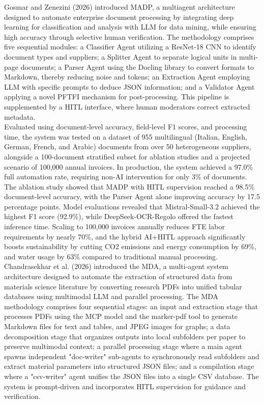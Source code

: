 \documentclass[11pt,a4paper]{report}
\begin{document}
Gosmar and Zenezini \cite{Gosmar2026MADPAM} (2026) introduced MADP, a multiagent architecture designed to automate enterprise document processing by integrating deep learning for classification and analysis with \ac{LLM} for data mining, while ensuring high accuracy through selective human verification. The methodology comprises five sequential modules: a Classifier Agent utilizing a ResNet-18 CNN to identify document types and suppliers; a Splitter Agent to separate logical units in multi-page documents; a Parser Agent using the Docling library to convert formats to Markdown, thereby reducing noise and tokens; an Extraction Agent employing \ac{LLM} with specific prompts to deduce JSON information; and a Validator Agent applying a novel \ac{PFTFI} mechanism for post-processing. This pipeline is supplemented by a \ac{HITL} interface, where human moderators correct extracted metadata.\\

Evaluated using document-level accuracy, field-level F1 scores, and processing time, the system was tested on a dataset of 955 multilingual (Italian, English, German, French, and Arabic) documents from over 50 heterogeneous suppliers, alongside a 100-document stratified subset for ablation studies and a projected scenario of 100,000 annual invoices. In production, the system achieved a 97.0\% full automation rate, requiring non-\ac{AI} intervention for only 3\% of documents. The ablation study showed that MADP with \ac{HITL} supervision reached a 98.5\% document-level accuracy, with the Parser Agent alone improving accuracy by 17.5 percentage points. Model evaluations revealed that Mistral-Small-3.2 achieved the highest F1 score (92.9\%), while DeepSeek-OCR-Regolo offered the fastest inference time. Scaling to 100,000 invoices annually reduces \ac{FTE} labor requirements by nearly 70\%, and the hybrid \ac{AI}+\ac{HITL} approach significantly boosts sustainability by cutting CO2 emissions and energy consumption by 69\%, and water usage by 63\% compared to traditional manual processing.\\

Chandrasekhar et al. \cite{Chandrasekhar2026MaterialDA} (2026) introduced the \ac{MDA}, a multi-agent system architecture designed to automate the extraction of structured data from materials science literature by converting research PDFs into unified tabular databases using multimodal \ac{LLM} and parallel processing. The \ac{MDA} methodology comprises four sequential stages: an input and extraction stage that processes PDFs using the MCP model and the marker-pdf tool to generate Markdown files for text and tables, and JPEG images for graphs; a data decomposition stage that organizes outputs into local subfolders per paper to preserve multimodal context; a parallel processing stage where a main agent spawns independent "doc-writer" sub-agents to synchronously read subfolders and extract material parameters into structured JSON files; and a compilation stage where a "csv-writer" agent unifies the JSON files into a single CSV database. The system is prompt-driven and incorporates \ac{HITL} supervision for guidance and verification.\\
\end{document}
